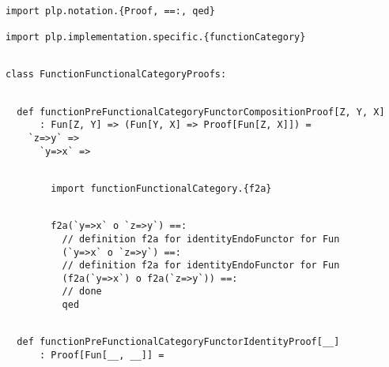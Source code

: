 \documentclass[11pt]{article}
\begin{document}
\vspace{6pt}
\begin{mdframed}[backgroundcolor=lightgray!20] 
\begin{lstlisting} 

import plp.notation.{Proof, ==:, qed}

import plp.implementation.specific.{functionCategory}
\end{lstlisting}
\end{mdframed}
\vspace{6pt}
\begin{mdframed}[backgroundcolor=lightgray!20] 
\begin{lstlisting}

class FunctionFunctionalCategoryProofs:
\end{lstlisting}
\end{mdframed}
\vspace{6pt}
\begin{mdframed}[backgroundcolor=lightgray!20] 
\begin{lstlisting} 
  
  def functionPreFunctionalCategoryFunctorCompositionProof[Z, Y, X]
      : Fun[Z, Y] => (Fun[Y, X] => Proof[Fun[Z, X]]) =
    `z=>y` =>
      `y=>x` =>
\end{lstlisting}
\end{mdframed}
\vspace{6pt}
\begin{mdframed}[backgroundcolor=lightgray!20] 
\begin{lstlisting}

        import functionFunctionalCategory.{f2a}
\end{lstlisting}
\end{mdframed}
\vspace{6pt}
\begin{mdframed}[backgroundcolor=lightgray!20] 
\begin{lstlisting} 
        
        f2a(`y=>x` o `z=>y`) ==:
          // definition f2a for identityEndoFunctor for Fun
          (`y=>x` o `z=>y`) ==:
          // definition f2a for identityEndoFunctor for Fun
          (f2a(`y=>x`) o f2a(`z=>y`)) ==:
          // done
          qed
\end{lstlisting}
\end{mdframed}
\vspace{6pt}
\begin{mdframed}[backgroundcolor=lightgray!20] 
\begin{lstlisting} 
  
  def functionPreFunctionalCategoryFunctorIdentityProof[__]
      : Proof[Fun[__, __]] =
\end{lstlisting}
\end{mdframed}
\end{document}
